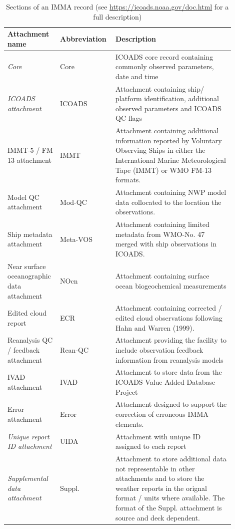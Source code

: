 \begin{table}
\centering
\caption{Sections of an IMMA record (see \url{https://icoads.noaa.gov/doc.html} for a full description)}
\label{tab:imma_structure}
\begin{tabular}{|p{0.2\linewidth}|p{0.2\linewidth}|p{0.5\linewidth}|}
\hline
\bfseries Attachment name & \bfseries Abbreviation & \bfseries Description \\
\hline
\it Core & Core & ICOADS core record containing commonly observed parameters, date and time\\\hline
\it ICOADS attachment & ICOADS & Attachment containing ship/ platform identification, additional observed parameters and ICOADS QC flags \\\hline
IMMT-5 / FM 13 attachment & IMMT & Attachment containing additional information reported by Voluntary Observing Ships in either the International Marine Meteorological Tape (IMMT) or WMO FM-13 formats. \\\hline
Model QC attachment & Mod-QC & Attachment containing NWP model data collocated to the location the observations. \\\hline
Ship metadata attachment & Meta-VOS & Attachment containing limited metadata from WMO-No. 47 merged with ship observations in ICOADS. \\\hline
Near surface oceanographic data attachment & NOcn & Attachment containing surface ocean biogeochemical measurements \\\hline
Edited cloud report & ECR & Attachment containing corrected / edited cloud observations following Hahn and Warren (1999). \\\hline
Reanalysis QC / feedback attachment & Rean-QC & Attachment providing the facility to include observation feedback information from reanalysis models \\\hline
IVAD attachment & IVAD & Attachment to store data from the ICOADS Value Added Database Project \\\hline
Error attachment & Error & Attachment designed to support the correction of erroneous IMMA elements. \\\hline
\it Unique report ID attachment & UIDA & Attachment with unique ID assigned to each report \\\hline
\it Supplemental data attachment & Suppl. & Attachment to store additional data not representable in other attachments and to store the weather reports in the orignal format / units where available. The format of the Suppl. attachment is source and deck dependent.\\\hline
\end{tabular}
\end{table}


